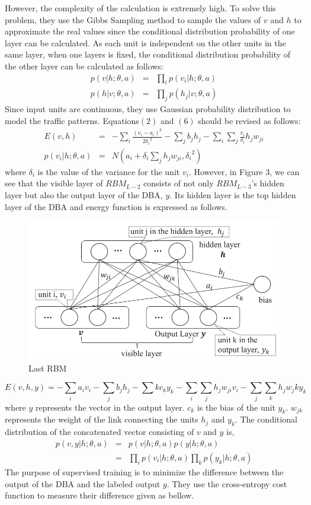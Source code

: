 \documentclass[11pt]{report}
\begin{document}
	However, the complexity of the calculation is extremely high. To solve this problem, they use the Gibbs Sampling method to sample the values of $v$ and $h$ to approximate the real values since the conditional distribution probability of one layer can be calculated. As each unit is independent on the other units in the same layer, when one layers is fixed, the conditional distribution probability of the other layer can be calculated as follows:
	\begin{eqnarray}
	p\left(v|h;\theta,a\right) &=& \prod_{i}p\left(v_i|h;\theta,a\right)\\
	p\left(h|v;\theta,a\right) &=& \prod_{j}p\left(h_j|v;\theta,a\right)
	\end{eqnarray}
	Since input units are continuous, they use Gaussian probability distribution to model the traffic patterns. Equations$\left(2\right)$ and $\left(6\right)$ should be revised as follows:
	\begin{eqnarray}
	E\left(v,h\right) &=& -\sum_{i}\frac{\left(v_i-a_i\right)^2}{2{\delta_i}^2}-\sum_{j}b_jh_j-\sum_{i}\sum_{j}\frac{v_i}{\delta_i}h_jw_{ji}\\
	p\left(v_i|h;\theta,a\right) &=& N\left(a_i+\delta_i\sum_{j}h_jw_{ji},{\delta_i}^2\right)	
	\end{eqnarray}
	where $\delta_i$ is the value of the variance for the unit $v_i$. 
	However, in Figure 3, we can see that the visible layer of $RBM_{L-2}$ consists of not only $RBM_{L-3}$'s hidden layer but also the output layer of the DBA, $y$. Its hidden layer is the top hidden layer of the DBA and energy function is expressed as follows.
	\begin{figure}[h!]
		\centering
		\includegraphics[width=0.5\linewidth]{figure3.png}
		\caption{Last RBM}
		\label{fig-label}
	\end{figure}
	\begin{equation}
	E\left(v,h,y\right) = -\sum_{i}a_iv_i-\sum_{j}b_jh_j-\sum{k}c_ky_k-\sum_{i}\sum_{j}h_jw_{ji}v_i-\sum_{j}\sum_{k}h_jw_jky_k
	\end{equation}
	where $y$ represents the vector in the output layer. $c_k$ is the bias of the unit $y_k$. $w_{jk}$ represents the weight of the link connecting the units $h_j$ and $y_k$. The conditional distribution of the concatenated vector consisting of $v$ and $y$ is,
	\begin{eqnarray}
	p\left(v,y|h;\theta,a\right) &=& p\left(v|h;\theta,a\right)p\left(y|h;\theta,a\right)\\
	&=&\prod_{i}p\left(v_i|h;\theta,a\right)\prod_{k}p\left(y_k|h;\theta,a\right)
	\end{eqnarray}
	The purpose of supervised training is to minimize the difference between the output of the DBA and the labeled output $y$. They use the cross-entropy cost function to measure their difference given as bellow.
	
\end{document}

